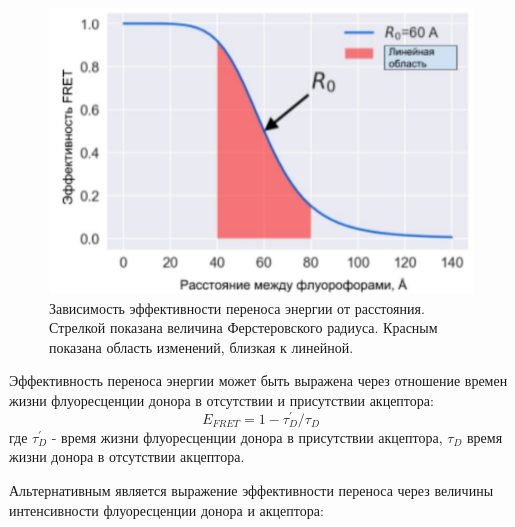 \begin{figure} [h!]
    \centering
    \includegraphics[width=\textwidth]{images/p1/part1_5_fret/part1_5_fret_f3.pdf}
    \caption[Зависимость эффективности переноса энергии от расстояния между флуорофорами.]{Зависимость эффективности переноса энергии от расстояния. Стрелкой показана величина Ферстеровского радиуса. Красным показана область изменений, близкая к линейной. }
    \label{fig:p1_5_fret:f3}
\end{figure}

    Эффективность переноса энергии может быть выражена через отношение времен жизни флуоресценции донора в отсутствии и присутствии акцептора:
\begin{equation}
    E_{FRET}= 1-\tau_{D}^{'}/\tau_D
\end{equation}
    где $\tau_{D}^{'}$ - время жизни флуоресценции донора в присутствии акцептора,  $\tau_D$ время жизни донора в отсутствии акцептора.
    
    Альтернативным является выражение эффективности переноса через величины интенсивности флуоресценции донора и акцептора:
    
